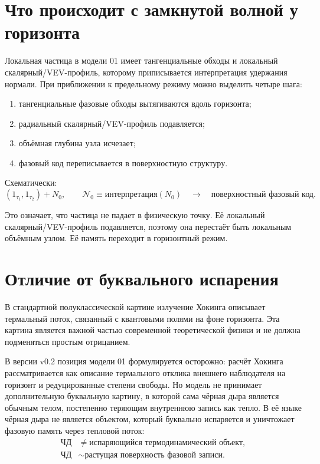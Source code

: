 \documentclass[11pt,a4paper]{article}
\newcommand{\normal}{\mathcal{N}}
\begin{document}
\section{Что происходит с замкнутой волной у горизонта}

Локальная частица в модели 01 имеет тангенциальные обходы и локальный скалярный/VEV-профиль, которому приписывается интерпретация удержания нормали. При приближении к предельному режиму можно выделить четыре шага:
\begin{enumerate}
\item тангенциальные фазовые обходы вытягиваются вдоль горизонта;
\item радиальный скалярный/VEV-профиль подавляется;
\item объёмная глубина узла исчезает;
\item фазовый код переписывается в поверхностную структуру.
\end{enumerate}

Схематически:
\begin{equation}
\left(1_{\tau_1},1_{\tau_2}\right)+N_0, \qquad \normal_0 \equiv \text{интерпретация}(N_0)
\quad \longrightarrow \quad
\text{поверхностный фазовый код}.
\end{equation}

Это означает, что частица не падает в физическую точку. Её локальный скалярный/VEV-профиль подавляется, поэтому она перестаёт быть локальным объёмным узлом. Её память переходит в горизонтный режим.

\section{Отличие от буквального испарения}

В стандартной полуклассической картине излучение Хокинга описывает термальный поток, связанный с квантовыми полями на фоне горизонта. Эта картина является важной частью современной теоретической физики и не должна подменяться простым отрицанием.

В версии v0.2 позиция модели 01 формулируется осторожно: расчёт Хокинга рассматривается как описание термального отклика внешнего наблюдателя на горизонт и редуцированные степени свободы. Но модель не принимает дополнительную буквальную картину, в которой сама чёрная дыра является обычным телом, постепенно теряющим внутреннюю запись как тепло. В её языке чёрная дыра не является объектом, который буквально испаряется и уничтожает фазовую память через тепловой поток:
\begin{equation}
\begin{aligned}
\text{ЧД} &\neq \text{испаряющийся термодинамический объект},\\
\text{ЧД} &\sim \text{растущая поверхность фазовой записи}.
\end{aligned}
\end{equation}
\end{document}
